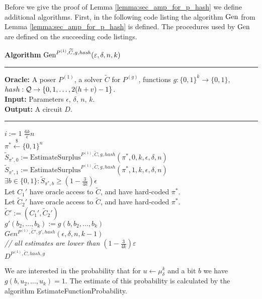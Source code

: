 Before we give the proof of Lemma \ref{lemma:sec_amp_for_p_hash} we define additional algorithms.
First, in the following code listing the algorithm $\operatorname{\text{Gen}}$ from Lemma \ref{lemma:sec_amp_for_p_hash} is defined.
The procedures used by $\operatorname{\text{Gen}}$ are defined on the succeeding code listings.
\begin{codeblock}
  \textbf{Algorithm} $\operatorname{\text{Gen}}^{P^{(1)}, \widetilde{C}, g, \mathit{hash}}(\varepsilon, \delta, n, k)$
  \medskip \hrule
  \textbf{Oracle:} A poser $P^{(1)}$, a solver $\widetilde{C}$ for $P^{(g)}$, functions $g: \{0,1\}^{k} \rightarrow \{0,1\}$, $hash:\mathcal{Q} \rightarrow \{0,1, \dots, 2(h + v) - 1\}$. \\
  \textbf{Input:}  Parameters $\epsilon$, $\delta$, $n$, $k$.\\
  \textbf{Output:} A circuit $D$.
  \medskip\hrule
  \For $i:=1$ \To $\frac{6k}{\epsilon}n$ \Do \\
  \IndI $\pi^* \xleftarrow{\$} \{0,1\}^{n}$\\
  \IndI $\widetilde{S}_{\pi^*,0} := \text{EstimateSurplus}^{P^{(1)},  \widetilde{C}, g, hash}(\pi^*, 0, k, \epsilon, \delta,n)$\\
  \IndI $\widetilde{S}_{\pi^*,1} := \text{EstimateSurplus}^{P^{(1)},  \widetilde{C}, g, hash}(\pi^*, 1, k, \epsilon, \delta,n)$\\
  \IndI \If $ \exists b \in \{0,1\}: \widetilde{S}_{\pi^*,b} \geq (1 - \frac{3}{4k}) \epsilon$ \Then \\
  \IndII Let $C_1'$ have oracle access to $\widetilde{C}$, and have hard-coded $\pi^*$. \\
  \IndII Let $\widetilde{C}_2'$ have oracle access to $\widetilde{C}$, and have hard-coded $\pi^*$. \\
  \IndII $\widetilde{C}' := (C_1', \widetilde{C}_2')$ \\
  \IndII $g'(b_2, \dots, b_k) := g(b, b_2, \dots, b_k)$\\
  \IndII\Return $Gen^{P^{(1)}, \widetilde{C}', g', hash}(\epsilon, \delta, n, k-1)$ \\
  \textit{// all estimates are lower than $(1-\frac{3}{4k})\varepsilon$}\\
  \Return $D^{P^{(1)}, \widetilde{C}, hash, g}$
\end{codeblock}
We are interested in the probability that for $u \leftarrow \mu_{\delta}^k$ and a bit $b$ we have $g(b,u_2, \dotsc, u_k) = 1$.
The estimate of this probability is calculated by the algorithm EstimateFunctionProbability.
%
